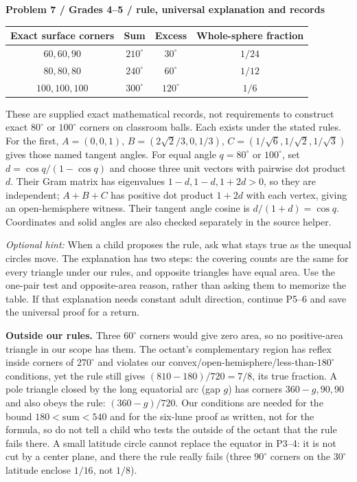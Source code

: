 \documentclass[11pt,letterpaper]{article}
\newcommand{\sub}[1]{\par\textbf{#1}\par}
\newcommand{\hint}[1]{\textit{Optional hint:} #1\par}
\newcommand{\degc}{^\circ}
\begin{document}
\sub{Problem 7 / Grades 4--5 / rule, universal explanation and records}
\begin{center}\begin{tabular}{c|c|c|c}
Exact surface corners & Sum & Excess & Whole-sphere fraction\\\hline
$60,60,90$ & $210\degc$ & $30\degc$ & $1/24$\\
$80,80,80$ & $240\degc$ & $60\degc$ & $1/12$\\
$100,100,100$ & $300\degc$ & $120\degc$ & $1/6$
\end{tabular}\end{center}
These are supplied exact mathematical records, not requirements to construct exact $80\degc$ or $100\degc$ corners on classroom balls. Each exists under the stated rules. For the first, $A=(0,0,1)$, $B=(2\sqrt2/3,0,1/3)$, $C=(1/\sqrt6,1/\sqrt2,1/\sqrt3)$ gives those named tangent angles. For equal angle $q=80\degc$ or $100\degc$, set $d=\cos q/(1-\cos q)$ and choose three unit vectors with pairwise dot product $d$. Their Gram matrix has eigenvalues $1-d,1-d,1+2d>0$, so they are independent; $A+B+C$ has positive dot product $1+2d$ with each vertex, giving an open-hemisphere witness. Their tangent angle cosine is $d/(1+d)=\cos q$. Coordinates and solid angles are also checked separately in the source helper.

\hint{When a child proposes the rule, ask what stays true as the unequal circles move. The explanation has two steps: the covering counts are the same for every triangle under our rules, and opposite triangles have equal area. Use the one-pair test and opposite-area reason, rather than asking them to memorize the table. If that explanation needs constant adult direction, continue P5--6 and save the universal proof for a return.}

\textbf{Outside our rules.} Three $60\degc$ corners would give zero area, so no positive-area triangle in our scope has them. The octant's complementary region has reflex inside corners of $270\degc$ and violates our convex/open-hemisphere/less-than-$180\degc$ conditions, yet the rule still gives $(810-180)/720=7/8$, its true fraction. A pole triangle closed by the long equatorial arc (gap $g$) has corners $360-g,90,90$ and also obeys the rule: $(360-g)/720$. Our conditions are needed for the bound $180<\text{sum}<540$ and for the six-lune proof as written, not for the formula, so do not tell a child who tests the outside of the octant that the rule fails there. A small latitude circle cannot replace the equator in P3--4: it is not cut by a center plane, and there the rule really fails (three $90\degc$ corners on the $30\degc$ latitude enclose $1/16$, not $1/8$).
\end{document}
